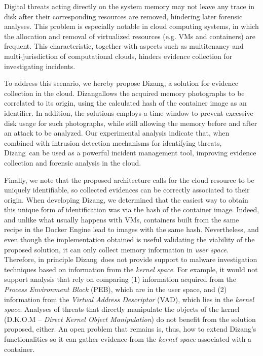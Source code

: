 \documentclass[conference]{IEEEtran}
\newcommand{\fancyname}{Dizang}
\begin{document}
Digital threats acting directly on the system memory may not leave any trace in disk after their corresponding resources are removed, hindering later forensic analyses.
%
This problem is especially notable in cloud computing systems, in which the allocation and removal of virtualized resources (e.g. VMs and containers) are frequent.
%
This characteristic, together with aspects such as multitenancy and multi-jurisdiction of computational clouds, hinders evidence collection for investigating incidents.


To address this scenario, we hereby propose \fancyname, a solution for evidence collection in the cloud.
%
\fancyname allows the acquired memory photographs to be correlated to its origin, using the calculated hash of the container image as an identifier.
%
In addition, the solutions employs a time window to prevent excessive disk usage for such photographs, while still allowing the memory before and after an attack to be analyzed.
%
Our experimental analysis indicate that, when combined with intrusion detection mechanisms for identifying threats, \fancyname\ can be used as a powerful incident management tool, improving evidence collection and forensic analysis in the cloud.
%


Finally, we note that the proposed architecture calls for the cloud resource to be uniquely identifiable, so collected evidences can be correctly associated to their origin.
%
When developing \fancyname, we determined that the easiest way to obtain this unique form of identification was via the hash of the container image.
%
Indeed, and unlike what usually happens with VMs, containers built from the same recipe in the Docker Engine lead to images with the same hash.
%
Nevertheless, and even though the implementation obtained is useful validating the viability of the proposed solution, it can only collect memory information in \textit{user space}.
%
Therefore, in principle \fancyname\ does not provide support to malware investigation techniques based on information from the \textit{kernel space}.
%
For example, it would not support analysis that rely on comparing (1) information acquired from the \textit{Process Environment Block} (PEB), which are in the user space, and (2) information from the \textit{Virtual Address Descriptor} (VAD), which lies in the \textit{kernel space}. 
%
Analyses of threats that directly manipulate the objects of the kernel (D.K.O.M – \textit{Direct Kernel Object Manipulation}) do not benefit from the solution proposed, either.
%
An open problem that remains is, thus, how to extend \fancyname's functionalities so it can gather evidence from the \textit{kernel space} associated with a container.
\end{document}
